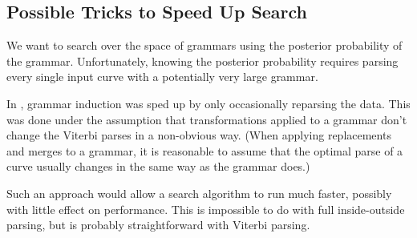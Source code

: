 \subsection{Possible Tricks to Speed Up Search}
We want to search over the space of grammars using the posterior
probability of the grammar. Unfortunately, knowing the posterior
probability requires parsing every single input curve with a
potentially very large grammar.

In \cite{stolcke}, grammar induction was sped up by only occasionally
reparsing the data. This was done under the assumption that
transformations applied to a grammar don't change the Viterbi parses
in a non-obvious way. (When applying replacements and merges to a
grammar, it is reasonable to assume that the optimal parse of a curve
usually changes in the same way as the grammar does.)

Such an approach would allow a search algorithm to run much faster,
possibly with little effect on performance. This is impossible to do
with full inside-outside parsing, but is probably straightforward with
Viterbi parsing.


